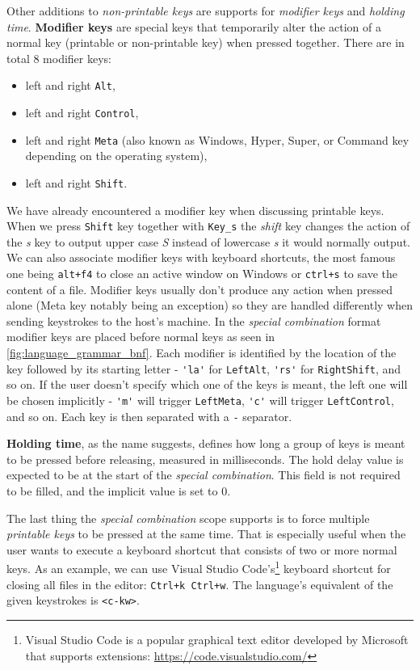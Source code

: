 Other additions to \emph{non-printable keys} are supports for \emph{modifier keys} and \emph{holding time}. \textbf{Modifier keys} are special keys that temporarily alter the action of a normal key (printable or non-printable key) when pressed together. There are in total 8 modifier keys:
\begin{itemize}
    \item left and right \verb|Alt|,
    \item left and right \verb|Control|,
    \item left and right \verb|Meta| (also known as Windows, Hyper, Super, or Command key depending on the operating system),
    \item left and right \verb|Shift|.
\end{itemize}
 We have already encountered a modifier key when discussing printable keys. When we press \verb|Shift| key together with \verb|Key_s| the \emph{shift} key changes the action of the \emph{s} key to output upper case \emph{S} instead of lowercase \emph{s} it would normally output. We can also associate modifier keys with keyboard shortcuts, the most famous one being \verb|alt+f4| to close an active window on Windows or \verb|ctrl+s| to save the content of a file. Modifier keys usually don't produce any action when pressed alone (Meta key notably being an exception) so they are handled differently when sending keystrokes to the host's machine. In the \emph{special combination} format modifier keys are placed before normal keys as seen in \autoref{fig:language_grammar_bnf}. Each modifier is identified by the location of the key followed by its starting letter \-- \verb|'la'| for \verb|LeftAlt|, \verb|'rs'| for \verb|RightShift|, and so on. If the user doesn't specify which one of the keys is meant, the left one will be chosen implicitly \-- \verb|'m'| will trigger \verb|LeftMeta|, \verb|'c'| will trigger \verb|LeftControl|, and so on. Each key is then separated with a \verb|-| separator.

\textbf{Holding time}, as the name suggests, defines how long a group of keys is meant to be pressed before releasing, measured in milliseconds. The hold delay value is expected to be at the start of the \emph{special combination}. This field is not required to be filled, and the implicit value is set to 0.

The last thing the \emph{special combination} scope supports is to force multiple \emph{printable keys} to be pressed at the same time. That is especially useful when the user wants to execute a keyboard shortcut that consists of two or more normal keys. As an example, we can use Visual Studio Code's\footnote{Visual Studio Code is a popular graphical text editor developed by Microsoft that supports extensions: \url{https://code.visualstudio.com/}} keyboard shortcut for closing all files in the editor: \verb|Ctrl+k Ctrl+w|. The language's equivalent of the given keystrokes is \verb|<c-kw>|.

